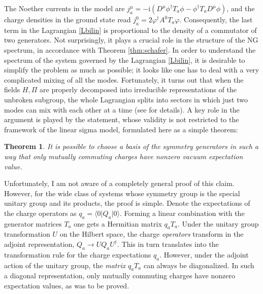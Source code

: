 \documentclass[final,2p,times,12pt,sort&compress]{elsarticle}
\newcommand\bra[1]{\langle#1\vert}          %
\newcommand\ket[1]{\vert#1\rangle}          %
\newcommand\he[1]{#1^{\dagger}}             %
\newcommand\imag{\mathrm i}                 %
\newcommand\thname{Theorem}
\newtheorem{theorem}{\thname}
\newcommand\vp{\varphi}
\begin{document}
The Noether currents in the model are $j^\mu_a=-\imag(D^\mu\he\phi T_a\phi-
\he\phi T_aD^\mu\phi)$, and the charge densities in the ground state read
$j^0_a=2\he\vp A^0T_a\vp$. Consequently, the last term in the Lagrangian
\eqref{Lbilin} is proportional to the density of a commutator of two
generators. Not surprisingly, it plays a crucial role in the structure of
the NG spectrum, in accordance with Theorem \ref{thm:schafer}. In order to
understand the spectrum of the system governed by the Lagrangian \eqref{Lbilin},
it is desirable to simplify the problem as much as possible; it looks like one
has to deal with a very complicated mixing of all the modes. Fortunately, it
turns out that when the fields $H,\Pi$ are properly decomposed into irreducible
representations of the unbroken subgroup, the whole Lagrangian splits into
sectors in which just two modes can mix with each other at a time (see
\cite{Brauner:2005di} for details). A key role in the argument is played by the
statement, whose validity is not restricted to the framework of the
linear sigma model, formulated here as a simple theorem:
\begin{theorem}
It is possible to choose a basis of the symmetry generators in such a way that
only mutually commuting charges have nonzero vacuum expectation value.
\end{theorem}
Unfortunately, I am not aware of a completely general proof of this claim.
However, for the wide class of systems whose symmetry group is the special
unitary group and its products, the proof is simple. Denote the expectations of
the charge operators as $q_a=\bra0Q_a\ket0$. Forming a linear combination with
the generator matrices $T_a$ one gets a Hermitian matrix $q_aT_a$. Under the
unitary group transformation $U$ on the Hilbert space, the charge
\emph{operators} transform in the adjoint representation, $Q_a\to UQ_a\he U$.
This in turn translates into the transformation rule for the charge expectations
$q_a$. However, under the adjoint action of the unitary group, the \emph{matrix}
$q_aT_a$ can always be diagonalized. In such a diagonal representation, only
mutually commuting charges have nonzero expectation values, as was to be proved.
\end{document}
